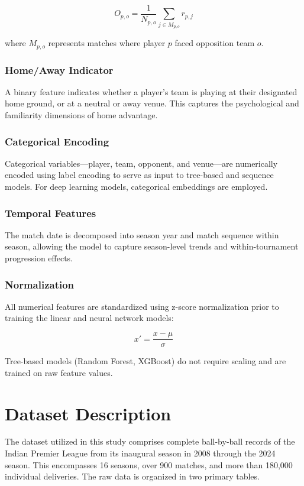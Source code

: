 \documentclass[conference]{IEEEtran}
\begin{document}
\begin{equation}
O_{p,o} = \frac{1}{N_{p,o}} \sum_{j \in M_{p,o}} r_{p,j}
\label{eq:opponent}
\end{equation}

where \(M_{p,o}\) represents matches where player \(p\) faced opposition team \(o\).

\subsubsection{Home/Away Indicator}
A binary feature indicates whether a player's team is playing at their designated home ground, or at a neutral or away venue. This captures the psychological and familiarity dimensions of home advantage.

\subsubsection{Categorical Encoding}
Categorical variables—player, team, opponent, and venue—are numerically encoded using label encoding to serve as input to tree-based and sequence models. For deep learning models, categorical embeddings are employed.

\subsubsection{Temporal Features}
The match date is decomposed into season year and match sequence within season, allowing the model to capture season-level trends and within-tournament progression effects.

\subsubsection{Normalization}
All numerical features are standardized using z-score normalization prior to training the linear and neural network models:

\begin{equation}
x' = \frac{x - \mu}{\sigma}
\label{eq:normalize}
\end{equation}

Tree-based models (Random Forest, XGBoost) do not require scaling and are trained on raw feature values.

\section{Dataset Description}
The dataset utilized in this study comprises complete ball-by-ball records of the Indian Premier League from its inaugural season in 2008 through the 2024 season. This encompasses 16 seasons, over 900 matches, and more than 180,000 individual deliveries. The raw data is organized in two primary tables.
\end{document}
